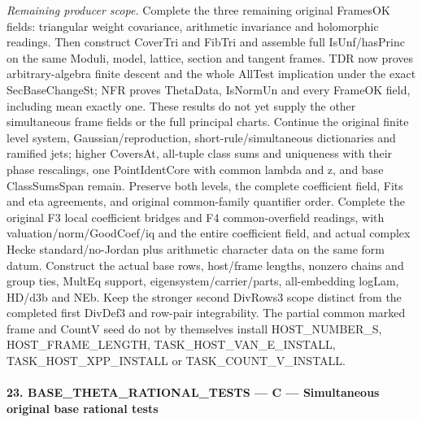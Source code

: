 \documentclass[11pt,a4paper]{article}
\numberwithin{equation}{section}
\theoremstyle{remark}\newtheorem{remark}[theorem]{Remark}
\begin{document}
\emph{Remaining producer scope.} Complete the three remaining original FramesOK fields: triangular weight covariance, arithmetic invariance and holomorphic readings. Then construct CoverTri and FibTri and assemble full IsUnf/hasPrinc on the same Moduli, model, lattice, section and tangent frames. TDR now proves arbitrary-algebra finite descent and the whole AllTest implication under the exact SecBaseChangeSt; NFR proves ThetaData, IsNormUn and every FrameOK field, including mean exactly one. These results do not yet supply the other simultaneous frame fields or the full principal charts. Continue the original finite level system, Gaussian/reproduction, short-rule/simultaneous dictionaries and ramified jets; higher CoversAt, all-tuple class sums and uniqueness with their phase rescalings, one PointIdentCore with common lambda and z, and base ClassSumsSpan remain. Preserve both levels, the complete coefficient field, Fits and eta agreements, and original common-family quantifier order. Complete the original F3 local coefficient bridges and F4 common-overfield readings, with valuation/norm/GoodCoef/iq and the entire coefficient field, and actual complex Hecke standard/no-Jordan plus arithmetic character data on the same form datum. Construct the actual base rows, host/frame lengths, nonzero chains and group ties, MultEq support, eigensystem/carrier/parts, all-embedding logLam, HD/d3b and NEb. Keep the stronger second DivRows3 scope distinct from the completed first DivDef3 and row-pair integrability. The partial common marked frame and CountV seed do not by themselves install HOST\_\allowbreak NUMBER\_\allowbreak S, HOST\_\allowbreak FRAME\_\allowbreak LENGTH, TASK\_\allowbreak HOST\_\allowbreak VAN\_\allowbreak E\_\allowbreak INSTALL, TASK\_\allowbreak HOST\_\allowbreak XPP\_\allowbreak INSTALL or TASK\_\allowbreak COUNT\_\allowbreak V\_\allowbreak INSTALL.



\paragraph{23. BASE\_\allowbreak THETA\_\allowbreak RATIONAL\_\allowbreak TESTS — C — Simultaneous original base rational tests}
\end{document}
